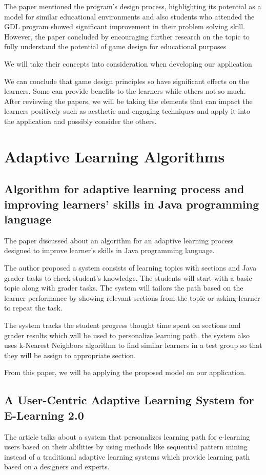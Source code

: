 The paper mentioned the program's design process, highlighting its potential as a model for similar educational environments and also students who attended the GDL program showed significant improvement in their problem solving skill. However, the paper concluded by encouraging further research on the topic to fully understand the potential of game design for educational purposes

We will take their concepts into consideration when developing our application\newline

\noindent\hspace{1.5em}
We can conclude that game design principles so have significant effects on the learners. Some can provide benefits to the learners while others not so much. After reviewing the papers, we will be taking the elements that can impact the learners positively such as aesthetic and engaging techniques and apply it into the application and possibly consider the others.


\section{Adaptive Learning Algorithms}
\subsection{Algorithm for adaptive learning process and improving learners’ skills in Java programming language \cite{Algo1}}
The paper discussed about an algorithm for an adaptive learning process designed to improve learner's skills in Java programming language.

The author proposed a system consists of learning topics with sections and Java grader tasks to check student's knowledge. The students will start with a basic topic along with grader tasks. The system will tailors the path based on the learner performance by showing relevant sections from the topic or asking learner to repeat the task. 

The system tracks the student progress thought time spent on sections and grader results which will be used to personalize learning path. the system also uses k-Nearest Neighbors algorithm to find similar learners in a test group so that they will be assign to appropriate section.

From this paper, we will be applying the proposed model on our application.
\subsection{A User-Centric Adaptive Learning System for E-Learning 2.0 \cite{Algo2}}
The article talks about a system that personalizes learning path for e-learning users based on their abilities by using methods like sequential pattern mining instead of a traditional adaptive learning systems which provide learning path based on a designers and experts.

